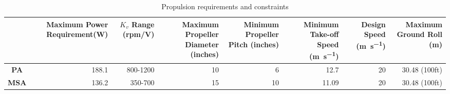 \begin{table}[H]
\centering

    \begin{tabular}{@{}cNNNNNNN@{}}
    \toprule
                                            & \textbf{Maximum Power Requirement(\si{\watt})} & \textbf{$K_v$ Range (rpm/V)} & \textbf{Maximum Propeller Diameter (inches)} & \textbf{Minimum Propeller Pitch (inches)} & \textbf{Minimum Take-off Speed (\si{\meter\per\second})} & \textbf{Design Speed (\si{\meter\per\second})} & \textbf{Maximum Ground Roll (\si{\meter})} \\ \midrule
    \textbf{PA}            & 188.1                                  & 800-1200                  & 10                                          & 6                                         & 12.7                                  & 20                          & 30.48 (100ft)                    \\
    \textbf{MSA} & 136.2                                  & 350-700                   & 15                                          & 10                                        & 11.09                                 & 20                          & 30.48 (100ft)                    \\ \bottomrule
    \end{tabular}
\caption{Propulsion requirements and constraints}
\label{tab: propulsion_requirement}
\end{table}